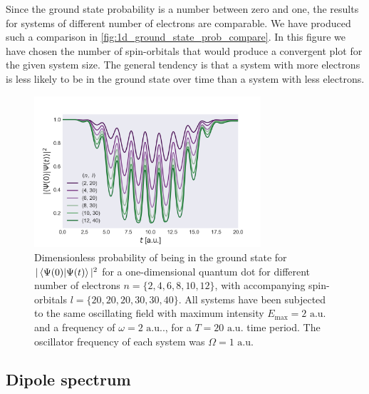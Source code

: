 Since the ground state probability is a number between zero and one, the results for systems 
of different number of electrons are comparable. We have produced such a comparison in 
\autoref{fig:1d_ground_state_prob_compare}. In this figure we have chosen the number of
spin-orbitals that would produce a convergent plot for the given system size. The general 
tendency is that a system with more electrons is less likely to be in the ground state 
over time than a system with less electrons.

\begin{figure}
    \centering
    \includegraphics[width=0.75\textwidth]{results/figures/1D/n_compare_overlap_2.png} 
    \caption{Dimensionless probability of being in the ground state for $|\braket*{\Psi(0)}{\Psi(t)}|^2$
        for a one-dimensional quantum dot for different number of electrons 
        $n = \{2,4,6,8,10,12\}$, with accompanying spin-orbitals $l=\{20,20,20,30,30,40\}$.
        All systems have been subjected to the same oscillating field with maximum intensity 
        $E_\text{max} = 2 \text{ a.u.}$ and a frequency of $\omega = 2 \text{ a.u.}.$, for 
        a $T= 20 \text{ a.u.}$ time period. The oscillator frequency of each system was
        $\Omega = 1 \text{ a.u.}$
    }
    \label{fig:1d_ground_state_prob_compare}
\end{figure}

\subsection{Dipole spectrum}

